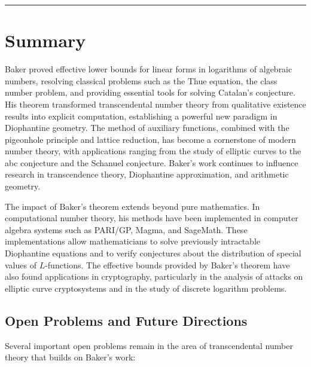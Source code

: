 \begin{center}\rule{0.5\linewidth}{0.5pt}\end{center}

\section*{Summary}

Baker proved effective lower bounds for linear forms in logarithms of algebraic numbers, resolving classical problems such as the Thue equation, the class number problem, and providing essential tools for solving Catalan's conjecture. His theorem transformed transcendental number theory from qualitative existence results into explicit computation, establishing a powerful new paradigm in Diophantine geometry. The method of auxiliary functions, combined with the pigeonhole principle and lattice reduction, has become a cornerstone of modern number theory, with applications ranging from the study of elliptic curves to the abc conjecture and the Schanuel conjecture. Baker's work continues to influence research in transcendence theory, Diophantine approximation, and arithmetic geometry.

The impact of Baker's theorem extends beyond pure mathematics. In computational number theory, his methods have been implemented in computer algebra systems such as PARI/GP, Magma, and SageMath. These implementations allow mathematicians to solve previously intractable Diophantine equations and to verify conjectures about the distribution of special values of $L$-functions. The effective bounds provided by Baker's theorem have also found applications in cryptography, particularly in the analysis of attacks on elliptic curve cryptosystems and in the study of discrete logarithm problems.

\subsection*{Open Problems and Future Directions}

Several important open problems remain in the area of transcendental number theory that builds on Baker's work:

